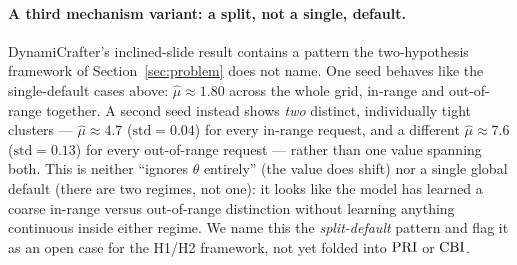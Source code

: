 \begin{center}
\renewcommand{\arraystretch}{1.15}
\label{tab:e4}
\end{center}

\paragraph{A third mechanism variant: a split, not a single, default.}
DynamiCrafter's inclined-slide result contains a pattern the two-hypothesis
framework of Section~\ref{sec:problem} does not name. One seed behaves like
the single-default cases above: $\hat\mu\approx1.80$ across the whole grid,
in-range and out-of-range together. A second seed instead shows \emph{two}
distinct, individually tight clusters --- $\hat\mu\approx4.7$
($\mathrm{std}=0.04$) for every in-range request, and a different
$\hat\mu\approx7.6$ ($\mathrm{std}=0.13$) for every out-of-range request ---
rather than one value spanning both. This is neither ``ignores $\theta$
entirely'' (the value does shift) nor a single global default (there are two
regimes, not one): it looks like the model has learned a coarse in-range
versus out-of-range distinction without learning anything continuous inside
either regime. We name this the \emph{split-default} pattern and flag it as
an open case for the H1/H2 framework, not yet folded into $\mathrm{PRI}$ or $\mathrm{CBI}$.

